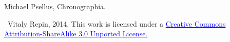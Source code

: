 \documentclass[a4paper]{article}
\newcommand{\myhref}[2]{\textcolor{blue}{\href{#1}{\textcolor{blue}{#2}}}}
\begin{document}
\noindent\begin{thebibliography}{9}
 Michael Psellus, Chronographia.
\end{thebibliography}

\centerline{\small \ccbysa\ Vitaly Repin, 2014. This work is licensed under a \myhref{http://creativecommons.org/licenses/by-sa/3.0/}{Creative Commons Attribution-ShareAlike 3.0 Unported License.}}
\end{document}
